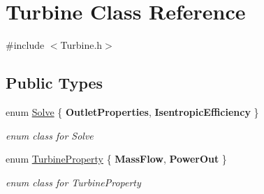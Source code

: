 \hypertarget{class_turbine}{}\section{Turbine Class Reference}
\label{class_turbine}


{\ttfamily \#include $<$Turbine.\+h$>$}

\subsection*{Public Types}
\begin{DoxyCompactItemize}
\item 
\mbox{\label{class_turbine_a9fd7beba6c6f071e228fbe3e07969d2b}} 
enum \hyperlink{class_turbine_a9fd7beba6c6f071e228fbe3e07969d2b}{Solve} \{ {\bfseries Outlet\+Properties}, 
{\bfseries Isentropic\+Efficiency}
 \}\begin{DoxyCompactList}\small\item\em enum class for Solve \end{DoxyCompactList}
\item 
\mbox{\label{class_turbine_a5db4f65cf2539e3837684d53221ade12}} 
enum \hyperlink{class_turbine_a5db4f65cf2539e3837684d53221ade12}{Turbine\+Property} \{ {\bfseries Mass\+Flow}, 
{\bfseries Power\+Out}
 \}\begin{DoxyCompactList}\small\item\em enum class for Turbine\+Property \end{DoxyCompactList}
\end{DoxyCompactItemize}
